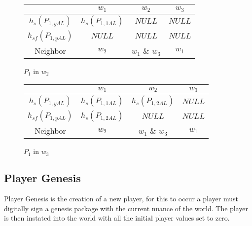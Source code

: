 \documentclass[runningheads,a4paper]{llncs}
\begin{document}
\begin{figure}
\caption{$P_1$ in $w_2$}
\begin{center}
\end{center}
\begin{center}
\begin{tabular}{ c|c c c }
& $w_1$ & $w_2$ & $w_3$ \\
\hline 
$h_s(P_{1,yAL})$ & $ h_s(P_{1,1AL})$ & $NULL$ & $NULL$ \\ 
$h_{sf}(P_{1,yAL})$ & $NULL$ & $NULL$ & $NULL$ \\ 
Neighbor & $w_2$ & $w_1$ \& $w_3$ & $w_1$\\
\end{tabular}
\end{center}
\end{figure}


\begin{figure}
\caption{$P_1$ in $w_3$}
\begin{center}
\end{center}
\begin{center}
\begin{tabular}{ c|c c c }
& $w_1$ & $w_2$ & $w_3$ \\
\hline 
$h_s(P_{1,yAL})$ & $h_s(P_{1,1AL})$ & $h_s(P_{1,2AL})$ & $NULL$ \\ 
$h_{sf}(P_{1,yAL})$ & $h_s(P_{1,2AL})$ & $NULL$ & $NULL$ \\ 
Neighbor & $w_2$ & $w_1$ \& $w_3$ & $w_1$\\
\end{tabular}
\end{center}
\end{figure}

\subsection{Player Genesis} 
\label{PG}
Player Genesis is the creation of a new player, for this to occur a player must digitally sign a genesis package with the current nuance of the world. The player is then instated into the world with all the initial player values set to zero. 
\end{document}

